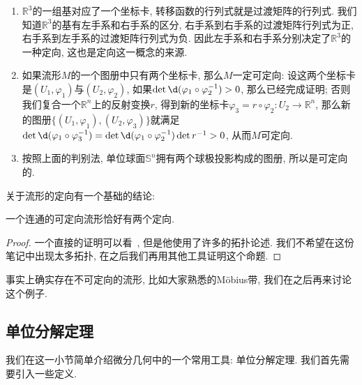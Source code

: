 \begin{eg}
    \begin{enumerate}[(1)]
        \item $\mathbb{R}^3$的一组基对应了一个坐标卡, 转移函数的行列式就是过渡矩阵的行列式.
        我们知道$\mathbb{R}^3$的基有左手系和右手系的区分, 右手系到右手系的过渡矩阵行列式为正, 右手系到左手系的过渡矩阵行列式为负.
        因此左手系和右手系分别决定了$\mathbb{R}^3$的一种定向, 这也是定向这一概念的来源.
        \item 如果流形$M$的一个图册中只有两个坐标卡, 那么$M$一定可定向:
        设这两个坐标卡是$(U_1,\varphi_1)$与$(U_2,\varphi_2)$, 如果$\det\d(\varphi_1\circ\varphi_2^{-1})>0$, 那么已经完成证明;
        否则我们复合一个$\mathbb{R}^n$上的反射变换$r$, 得到新的坐标卡$\varphi_3=r\circ\varphi_2:U_2\to\mathbb{R}^n$, 那么新的图册$\{(U_1,\varphi_1),(U_2,\varphi_3)\}$就满足$\det\d(\varphi_1\circ\varphi_3^{-1})=\det\d(\varphi_1\circ\varphi_2^{-1})\det{r^{-1}}>0$, 从而$M$可定向.
        \item 按照上面的判别法, 单位球面$\mathbb{S}^n$拥有两个球极投影构成的图册, 所以是可定向的.
    \end{enumerate}
\end{eg}

关于流形的定向有一个基础的结论:

\begin{prop}
    一个连通的可定向流形恰好有两个定向.
\end{prop}

\begin{proof}
    一个直接的证明可以看~\parencite[引理1.1.2]{Mei_Manifold}, 但是他使用了许多的拓扑论述.
    我们不希望在这份笔记中出现太多拓扑, 在之后我们再用其他工具证明这个命题.
\end{proof}

事实上确实存在不可定向的流形, 比如大家熟悉的M\"{o}bius带, 我们在之后再来讨论这个例子.\label{sect_of_mani}

\subsection*{单位分解定理}

我们在这一小节简单介绍微分几何中的一个常用工具: 单位分解定理.
我们首先需要引入一些定义.

